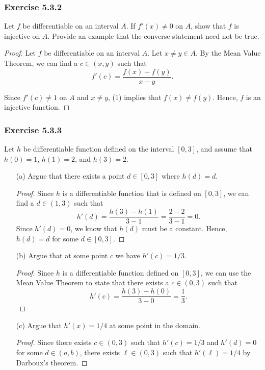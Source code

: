 \subsubsection{Exercise 5.3.2} Let \( f  \) be differentiable on an interval \( A  \). If \( f'(x) \neq 0  \) on \( A  \), show that \( f  \) is injective on \( A  \). Provide an example that the converse statement need not be true.

\begin{proof}
    Let \( f  \) be differentiable on an interval \( A  \). Let \( x \neq y  \in A  \). By the Mean Value Theorem, we can find a \( c \in (x,y) \) such that 
    \[  f'(c) = \frac{ f(x) - f(y)  }{ x - y  } \tag{1}. \]

    Since \( f'(c) \neq 1  \) on \( A  \) and \( x \neq y  \), (1) implies that \( f(x) \neq f(y)  \). Hence, \( f  \) is an injective function. 
\end{proof}

\subsubsection{Exercise 5.3.3} Let \( h  \) be differentiable function defined on the interval \( [0,3] \), and assume that \( h(0) = 1  \), \( h(1) = 2  \), and \( h(3) = 2  \).
\begin{enumerate}
    \item[(a)] Argue that there exists a point \( d \in [0,3]  \) where \( h(d) = d  \).
        \begin{proof}
            Since \( h  \) is a differentiable function that is defined on \( [0,3] \), we can find a \( d \in (1,3)  \) such that 
            \[  h'(d) = \frac{ h(3) - h(1)  }{ 3 - 1  } = \frac{ 2 - 2  }{ 3 - 1  } = 0. \]
            Since \( h'(d) = 0  \), we know that \( h(d)  \) must be a constant. Hence, \( h(d) = d  \) for some \( d \in [0,3] \).
        \end{proof}
    \item[(b)] Argue that at some point \( c  \) we have \( h'(c) = 1 / 3  \).
        \begin{proof}
            Since \( h  \) is a differentiable function defined on \( [0,3]  \), we can use the Mean Value Theorem to state that there exists a \( c \in (0,3) \) such that 
            \[ h'(c) = \frac{ h(3) - h(0) }{ 3 - 0  } = \frac{ 1 }{ 3 }.  \]
        \end{proof}
    \item[(c)] Argue that \( h'(x) = 1/4 \) at some point in the domain.
        \begin{proof}
            Since there exists \(  c \in (0,3)  \) such that \( h'(c) = 1 / 3  \) and \( h'(d) = 0  \) for some \( d \in(a,b)   \), there exists \( \ell \in (0,3)  \) such that \( h'(\ell) = 1 / 4  \) by Darboux's theorem.
        \end{proof}
\end{enumerate}


